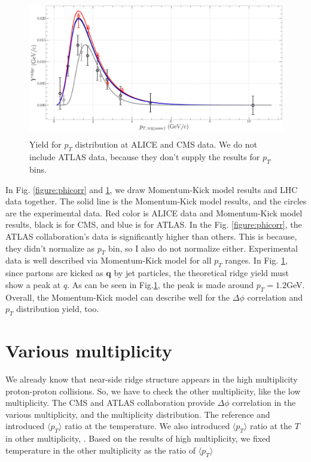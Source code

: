 \documentclass[jkps,fleqn,showpacs,showkeys]{revtex4}
\begin{document}
\begin{figure}[ht]
\centering
\includegraphics[width=12cm, height=6cm]{./Figures/Paper_pTdis}
\caption{Yield for $p_T$ distribution at ALICE and CMS data. We do not include ATLAS data, because they don't supply the results for $p_T$ bins.}
\label{figure:pTdis}
\end{figure}

In Fig. \ref{figure:phicorr} and \ref{figure:pTdis}, we draw Momentum-Kick model results and LHC data together.
The solid line is the Momentum-Kick model results, and the circles are the experimental data.
Red color is ALICE data and Momentum-Kick model results, black is for CMS, and blue is for ATLAS.
In the Fig. \ref{figure:phicorr}, the ATLAS collaboration's data is significantly higher than others.
This is because, they didn't normalize as $p_T$ bin, so I also do not normalize either.
Experimental data is well described via Momentum-Kick model for all $p_T$ ranges.
In Fig. \ref{figure:pTdis}, since partons are kicked as $\textbf{q}$ by jet particles, the theoretical ridge yield must show a peak at $q$.
As can be seen in Fig.\ref{figure:pTdis}, the peak is made around $p_T=1.2$GeV.
Overall, the Momentum-Kick model can describe well for the $\Delta\phi$ correlation and $p_T$ distribution yield, too.


\section*{Various multiplicity}
\label{sec:Various multiplicity}

We already know that near-side ridge structure appears in the high multiplicity proton-proton collisions.
So, we have to check the other multiplicity, like the low multiplicity.
The CMS and ATLAS collaboration provide $\Delta \phi$ correlation in the various multiplicity, and the multiplicity distribution.
The reference \cite{Wong_5} and \cite{PbPb} introduced $\langle p_T \rangle$ ratio at the temperature.
We also introduced $\langle p_T \rangle$ ratio at the $T$ in other multiplicity, .
Based on the results of high multiplicity, we fixed temperature in the other multiplicity as the ratio of $\langle p_T \rangle$
\end{document}
